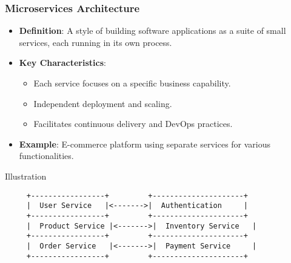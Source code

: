 \documentclass[aspectratio=169]{beamer}
\begin{document}
\begin{frame}[fragile]
    \frametitle{Microservices Architecture}
    \begin{itemize}
        \item \textbf{Definition}: A style of building software applications as a suite of small services, each running in its own process.
        \item \textbf{Key Characteristics}:
        \begin{itemize}
            \item Each service focuses on a specific business capability.
            \item Independent deployment and scaling.
            \item Facilitates continuous delivery and DevOps practices.
        \end{itemize}
        \item \textbf{Example}: E-commerce platform using separate services for various functionalities.
    \end{itemize}
    
    \begin{block}{Illustration}
        \begin{verbatim}
     +-----------------+         +---------------------+
     |  User Service   |<------->|  Authentication     |
     +-----------------+         +---------------------+
     |  Product Service |<------->|  Inventory Service   |
     +-----------------+         +---------------------+
     |  Order Service   |<------->|  Payment Service     |
     +-----------------+         +---------------------+
        \end{verbatim}
    \end{block}
\end{frame}
\end{document}
